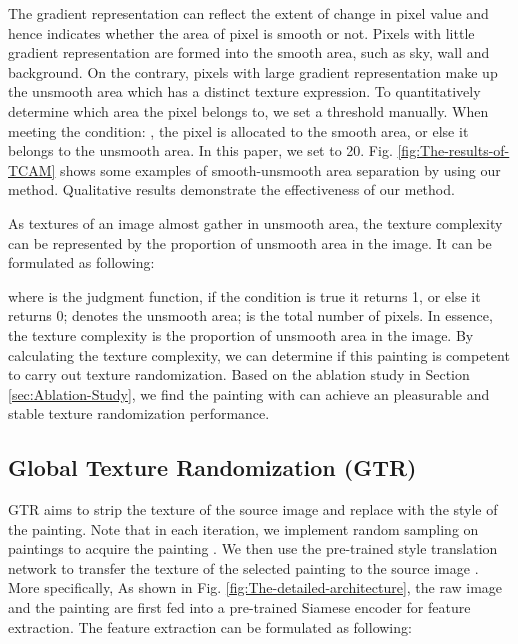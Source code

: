 \documentclass[twocolumn,journal,vlined,ruled,linesnumbered]{IEEEtran}
\begin{document}
The gradient representation  can reflect the extent of change in pixel value and hence indicates whether the area of pixel is smooth or not. Pixels with little gradient representation are formed into the smooth area, such as sky, wall and background. On the contrary, pixels with large gradient representation make up the unsmooth area which has a distinct texture expression. To quantitatively determine which area the pixel belongs to, we set a threshold  manually. When meeting the condition: , the pixel is allocated to the smooth area, or else it belongs to the unsmooth area. In this paper, we set  to 20. Fig. \ref{fig:The-results-of-TCAM} shows some examples of smooth-unsmooth area separation by using our method. Qualitative results demonstrate the effectiveness of our method.

As textures of an image almost gather in unsmooth area, the texture complexity can be represented by the proportion of unsmooth area in the image. It can be formulated as following:

\vspace{-2mm}


where  is the judgment function, if the condition is true it returns 1, or else it returns 0;  denotes the unsmooth area;  is the total number of pixels. In essence, the texture complexity is the proportion of unsmooth area in the image. By calculating the texture complexity, we can determine if this painting is competent to carry out texture randomization. Based on the ablation study in Section \ref{sec:Ablation-Study}, we find the painting with  can achieve an pleasurable and stable texture randomization performance.

\subsection{Global Texture Randomization (GTR)}

GTR aims to strip the texture of the source image and replace with the style of the painting. Note that in each iteration, we implement random sampling on  paintings to acquire the painting . We then use the pre-trained style translation network \cite{huang2017arbitrary} to transfer the texture of the selected painting to the source image . More specifically, As shown in Fig. \ref{fig:The-detailed-architecture}, the raw image  and the painting  are first fed into a pre-trained Siamese encoder for feature extraction. The feature extraction can be formulated as following:\vspace{-2mm}
\end{document}
